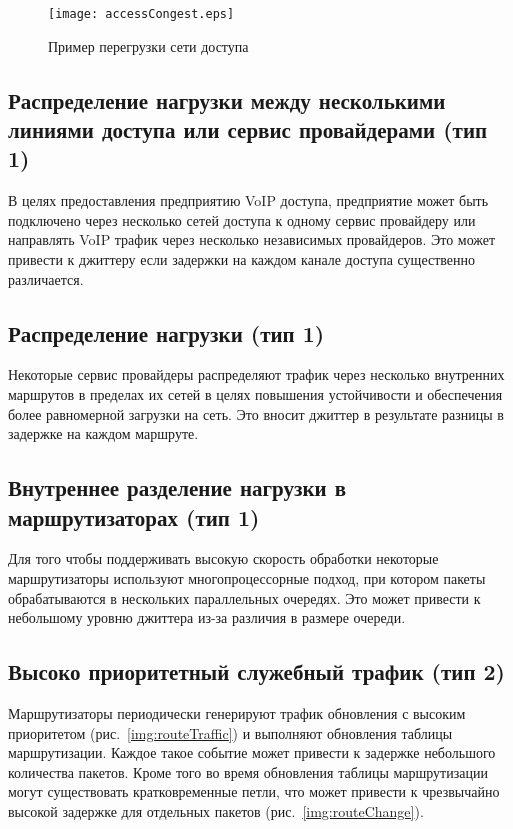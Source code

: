 \begin{figure} [h]
  \center
\texttt{[image: accessCongest.eps]}
  \caption{Пример перегрузки сети доступа \cite{clark}}
  \label{img:accessCongest}
\end{figure}

\subsection{Распределение нагрузки между несколькими линиями доступа или сервис провайдерами (тип 1) } \label{subsect2_1_4}
В целях предоставления предприятию VoIP доступа, предприятие может быть подключено через несколько сетей доступа к одному сервис провайдеру или направлять VoIP трафик через несколько независимых провайдеров. Это может привести к джиттеру если задержки на каждом канале доступа существенно различается.

\subsection{Распределение нагрузки (тип 1) } \label{subsect2_1_5}
Некоторые сервис провайдеры распределяют трафик через несколько внутренних маршрутов в пределах их сетей в целях повышения устойчивости и обеспечения более равномерной загрузки на сеть. Это вносит джиттер в результате разницы в задержке на каждом маршруте.

\subsection{Внутреннее разделение нагрузки в маршрутизаторах (тип 1) } \label{subsect2_1_6}
Для того чтобы поддерживать высокую скорость обработки некоторые маршрутизаторы используют многопроцессорные подход, при котором пакеты обрабатываются в нескольких параллельных очередях. Это может привести к небольшому уровню джиттера из-за различия в размере очереди.

\subsection{Высоко приоритетный служебный трафик (тип 2) } \label{subsect2_1_7}
Маршрутизаторы периодически генерируют трафик обновления с высоким приоритетом (рис. \ref{img:routeTraffic}) и выполняют обновления таблицы маршрутизации. Каждое такое событие может привести к задержке небольшого количества пакетов. Кроме того во время обновления таблицы маршрутизации могут существовать кратковременные петли, что может привести к чрезвычайно высокой задержке для отдельных пакетов (рис. \ref{img:routeChange}).

